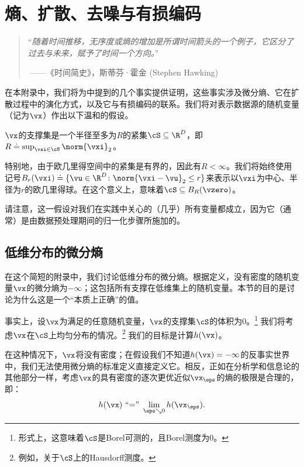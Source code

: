 \documentclass[../../book-main_zh.tex]{subfiles}
\begin{document}
\chapter{熵、扩散、去噪与有损编码}\label{app:entropy}

\begin{quote}
    ``{\em 随着时间推移，无序度或熵的增加是所谓时间箭头的一个例子，它区分了过去与未来，赋予了时间一个方向。}''

    $~$\hfill ——《时间简史》，斯蒂芬·霍金 (Stephen Hawking)
\end{quote}
\vspace{5mm}

在本附录中，我们将为中提到的几个事实提供证明，这些事实涉及微分熵、它在扩散过程中的演化方式，以及它与有损编码的联系。我们将对表示数据源的随机变量（记为\(\vx\)）作出以下温和的假设。

\begin{assumption}\label{assumption:entropy_x_compact_support}
    \(\vx\)的支撑集是一个半径至多为\(R\)的紧集\(\cS \subseteq \R^{D}\)，即\(R \doteq \sup_{\vxi \in \cS}\norm{\vxi}_{2}\)。
\end{assumption}

特别地，由于欧几里得空间中的紧集是有界的，因此有\(R < \infty\)。我们将始终使用记号\(B_{r}(\vxi) \doteq \{\vu \in \R^{D} \colon \norm{\vxi - \vu}_{2}
\leq r\}\)来表示以\(\vxi\)为中心、半径为\(r\)的欧几里得球。在这个意义上，意味着\(\cS \subseteq B_{R}(\vzero)\)。

请注意，这一假设对我们在实践中关心的（几乎）所有变量都成立，因为它（通常）是由数据预处理期间的归一化步骤所施加的。

\section{低维分布的微分熵}\label{sec:low_dim_entropy}

在这个简短的附录中，我们讨论低维分布的微分熵。根据定义，没有密度的随机变量\(\vx\)的微分熵为\(-\infty\)；这包括所有支撑在低维集上的随机变量。本节的目的是讨论为什么这是一个“本质上正确”的值。

事实上，设\(\vx\)为满足的任意随机变量，\(\vx\)的支撑集\(\cS\)的体积为\(0\)。\footnote{形式上，这意味着\(\cS\)是Borel可测的，且Borel测度为\(0\)。} 我们将考虑\(\vx\)在\(\cS\)上均匀分布的情况。\footnote{例如，关于\(\cS\)上的Hausdorff测度。} 我们的目标是计算\(h(\vx)\)。

在这种情况下，\(\vx\)将没有密度；在假设我们不知道\(h(\vx) = -\infty\)的反事实世界中，我们无法使用微分熵的标准定义直接定义它。相反，正如在分析学和信息论的其他部分一样，考虑\(\vx\)的具有密度的逐次更优近似\(\vx_{\eps}\)的熵的极限是合理的，即：
\begin{equation}
    h(\vx)\ \text{``=''}\ \lim_{\eps \searrow 0}h(\vx_{\eps}).
\end{equation}
\end{document}
